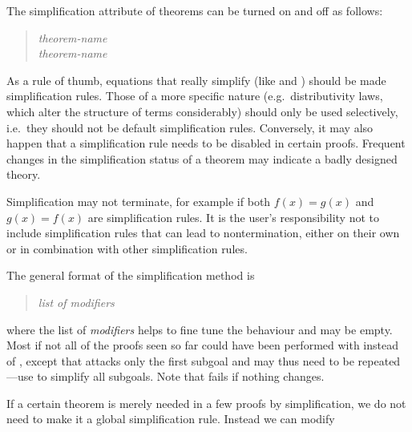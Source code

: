 \begin{isabellebody}
\begin{isamarkuptext}
The simplification attribute of theorems can be turned on and off as follows:
\begin{quote}
 \textit{theorem-name}\\
 \textit{theorem-name}
\end{quote}
As a rule of thumb, equations that really simplify (like  and ) should be made simplification
rules.  Those of a more specific nature (e.g.\ distributivity laws, which
alter the structure of terms considerably) should only be used selectively,
i.e.\ they should not be default simplification rules.  Conversely, it may
also happen that a simplification rule needs to be disabled in certain
proofs.  Frequent changes in the simplification status of a theorem may
indicate a badly designed theory.
\begin{warn}
  Simplification may not terminate, for example if both $f(x) = g(x)$ and
  $g(x) = f(x)$ are simplification rules. It is the user's responsibility not
  to include simplification rules that can lead to nontermination, either on
  their own or in combination with other simplification rules.
\end{warn}%
\end{isamarkuptext}%
%
%
\begin{isamarkuptext}%
The general format of the simplification method is
\begin{quote}
 \textit{list of modifiers}
\end{quote}
where the list of \emph{modifiers} helps to fine tune the behaviour and may
be empty. Most if not all of the proofs seen so far could have been performed
with  instead of , except that  attacks
only the first subgoal and may thus need to be repeated---use
 to simplify all subgoals.
Note that  fails if nothing changes.%
\end{isamarkuptext}%
%
%
\begin{isamarkuptext}%
If a certain theorem is merely needed in a few proofs by simplification,
we do not need to make it a global simplification rule. Instead we can modify

\end{isamarkuptext}
\end{isabellebody}
